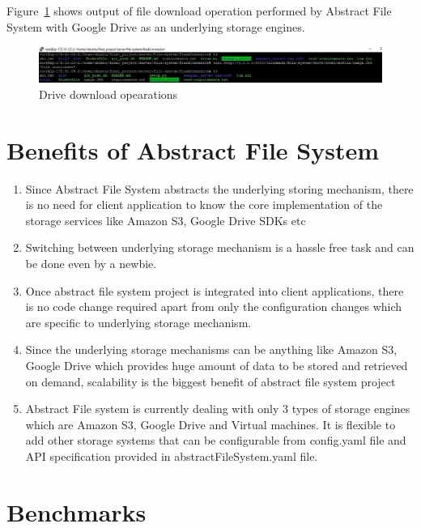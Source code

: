 Figure~\ref{fig:drive-download} 
shows output of file download operation performed 
by Abstract File System with Google Drive as an underlying storage engines. 

\begin{figure}[!ht]
        \centering\includegraphics[width=\columnwidth]
        {image/drive-download.JPG}
        \caption{Drive download opearations}\label{fig:drive-download}
\end{figure}


\section{Benefits of Abstract File System}
\begin{enumerate}
    \item Since Abstract File System abstracts the underlying storing 
mechanism, there is no need for client application to know 
the core implementation of the storage 
services like Amazon S3, Google Drive SDKs etc
    
    \item Switching between underlying storage mechanism is a hassle free task 
and can be done even by a newbie.
    
    \item Once abstract file system project is integrated into client 
applications, there is no code change required apart from only the 
configuration changes which are specific to underlying storage mechanism.
    
    \item Since the underlying storage mechanisms can be anything like Amazon 
S3, Google Drive which 
provides huge amount of data to be stored and retrieved on demand, scalability 
is the biggest benefit of abstract file system
	project
	
    \item Abstract File system is currently dealing with only 3 types of storage engines 
which are Amazon S3, Google Drive and Virtual machines. 
It is flexible to add other storage systems that can be configurable from config.yaml 
file and API specification provided in abstractFileSystem.yaml file.
    
\end{enumerate}


\section{Benchmarks}

